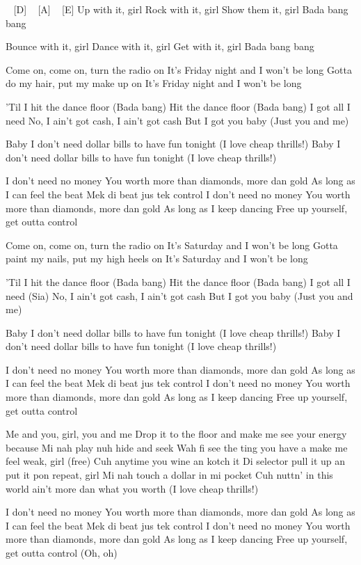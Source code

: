 \begin{guitar}
[F#-] ~ [D] ~ [A] ~ [E] 
Up with it, girl
Rock with it, girl
Show them it, girl
Bada bang bang

Bounce with it, girl
Dance with it, girl
Get with it, girl
Bada bang bang

Come on, come on, turn the radio on
It's Friday night and I won't be long
Gotta do my hair, put my make up on
It's Friday night and I won't be long

'Til I hit the dance floor (Bada bang)
Hit the dance floor (Bada bang)
I got all I need
No, I ain't got cash, I ain't got cash
But I got you baby
(Just you and me)


Baby I don't need dollar bills to have fun tonight
(I love cheap thrills!)
Baby I don't need dollar bills to have fun tonight
(I love cheap thrills!)

I don't need no money
You worth more than diamonds, more dan gold
As long as I can feel the beat
Mek di beat jus tek control
I don't need no money
You worth more than diamonds, more dan gold
As long as I keep dancing
Free up yourself, get outta control

Come on, come on, turn the radio on
It's Saturday and I won't be long
Gotta paint my nails, put my high heels on
It's Saturday and I won't be long

'Til I hit the dance floor (Bada bang)
Hit the dance floor (Bada bang)
I got all I need (Sia)
No, I ain't got cash, I ain't got cash
But I got you baby
(Just you and me)

Baby I don't need dollar bills to have fun tonight
(I love cheap thrills!)
Baby I don't need dollar bills to have fun tonight
(I love cheap thrills!)

I don't need no money
You worth more than diamonds, more dan gold
As long as I can feel the beat
Mek di beat jus tek control
I don't need no money
You worth more than diamonds, more dan gold
As long as I keep dancing
Free up yourself, get outta control

Me and you, girl, you and me
Drop it to the floor and make me see your energy because
Mi nah play nuh hide and seek
Wah fi see the ting you have a make me feel weak, girl (free)
Cuh anytime you wine an kotch it
Di selector pull it up an put it pon repeat, girl
Mi nah touch a dollar in mi pocket
Cuh nuttn' in this world ain't more dan what you worth (I love cheap thrills!)

I don't need no money
You worth more than diamonds, more dan gold
As long as I can feel the beat
Mek di beat jus tek control
I don't need no money
You worth more than diamonds, more dan gold
As long as I keep dancing
Free up yourself, get outta control (Oh, oh)


\end{guitar}
